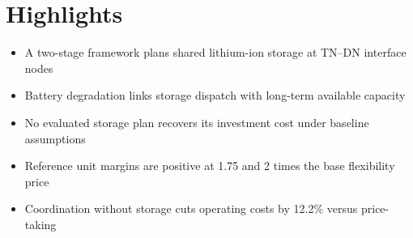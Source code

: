 \documentclass[12pt]{article}
\begin{document}
\section*{Highlights}

\begin{itemize}
    \item A two-stage framework plans shared lithium-ion storage at TN--DN interface nodes
    \item Battery degradation links storage dispatch with long-term available capacity
    \item No evaluated storage plan recovers its investment cost under baseline assumptions
    \item Reference unit margins are positive at 1.75 and 2 times the base flexibility price
    \item Coordination without storage cuts operating costs by 12.2\% versus price-taking
\end{itemize}
\end{document}
